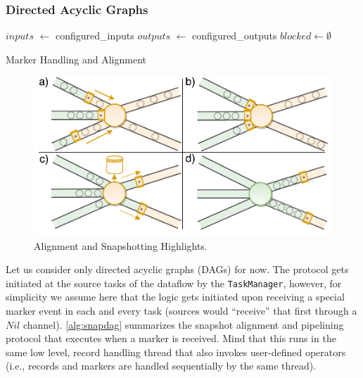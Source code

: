 \subsubsection{Directed Acyclic Graphs}

\begin{algorithm}
$inputs$ $\leftarrow$ configured\_inputs\;
$outputs$ $\leftarrow$ configured\_outputs\;
$blocked \leftarrow \emptyset$ \;

\caption{Marker Handling and Alignment}
\label{alg:snapdag}
\end{algorithm}

\begin{figure}[t]
\centering
\includegraphics[width=\textwidth / 2]{figures/snapshots-highlights.pdf}
\caption{Alignment and Snapshotting Highlights.} 
\label{fig:snapshots-highlights}
\vspace{-4mm}
\end{figure}

Let us consider only directed acyclic graphs (DAGs) for now. The protocol gets initiated at the source tasks of the dataflow by the \texttt{TaskManager}, however, for simplicity we assume here that the logic gets initiated upon receiving a special marker event in each and every task (sources would ``receive'' that first through a $Nil$ channel). \autoref{alg:snapdag} summarizes the snapshot alignment and pipelining protocol that executes when a marker is received. Mind that this runs in the same low level, record handling thread that also invokes user-defined operators (i.e., records and markers are handled sequentially by the same thread). 

